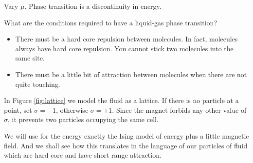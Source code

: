 \documentclass[]{article}
\begin{document}
Vary $\mu$. Phase transition is a discontinuity in energy.

What are the conditions required to have a liquid-gas phase transition?

\begin{itemize}
	\item There must be a hard core repulsion between molecules.
	In fact, molecules always have hard core repulsion.
	You cannot stick two molecules into the same site. 
	\item  There must be a little bit
	of attraction between molecules when there are not
	quite touching.
\end{itemize}

In Figure \ref{fig:lattice} we model the fluid as a lattice. If there is no particle at a point, set $\sigma=-1$, otherwise $\sigma=+1$. Since the magnet forbids any other value of $\sigma$, it prevents two particles occupying the same cell.

We will use for the energy exactly the Ising model
of energy plus a little magnetic field. And we shall see how
this translates in the language of our particles of fluid which
are hard core and have short range attraction.
	
\end{document}
